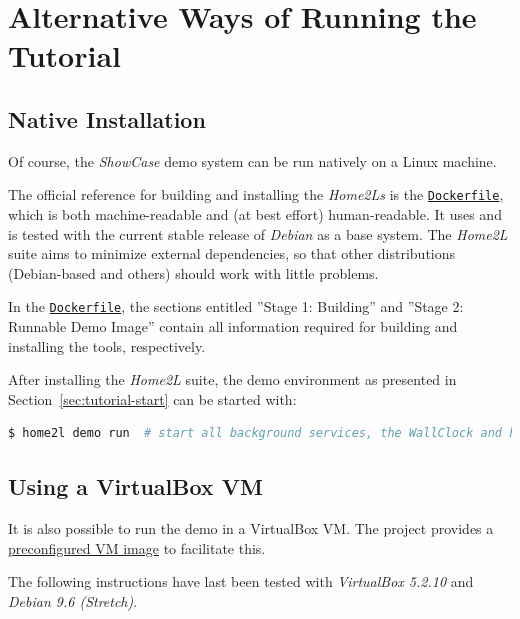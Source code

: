 \documentclass[12pt,english,parskip=half,headheight=19pt]{scrreprt}
\newcommand{\refdoc}[2]{\href{#1}{#2}}              %
\newcommand{\refsrc}[1]{\href{#1}{\texttt{#1}}}     %
\begin{document}
\clearpage
\section{Alternative Ways of Running the Tutorial}
\label{sec:tutorial-nodocker}


\subsection{Native Installation}
\label{sec:tutorial-nodocker-native}

Of course, the \textit{ShowCase} demo system can be run natively on a Linux machine.

The official reference for building and installing the \textit{Home2Ls} is the \refsrc{Dockerfile}, which is both machine-readable and (at best effort) human-readable. It uses and is tested with the current stable release of \textit{Debian} as a base system. The \textit{Home2L} suite aims to minimize external dependencies, so that other distributions (Debian-based and others) should work with little problems.

In the \refsrc{Dockerfile}, the sections entitled ''Stage 1: Building'' and ''Stage 2: Runnable Demo Image'' contain all information required for building and installing the tools, respectively.

After installing the \textit{Home2L} suite, the demo environment as presented in Section~\ref{sec:tutorial-start} can be started with:
\begin{lstlisting}[language=bash]
  $ home2l demo run  # start all background services, the WallClock and home2l-showhouse
\end{lstlisting}


\subsection{Using a VirtualBox VM}
\label{sec:tutorial-nodocker-vbox}

It is also possible to run the demo in a VirtualBox VM. The project provides a
\refdoc{home2l-showcase-vbox.tar.gz}{preconfigured VM image} to facilitate this.

The following instructions have last been tested with \textit{VirtualBox 5.2.10} and \textit{Debian 9.6 (Stretch)}.
\end{document}

